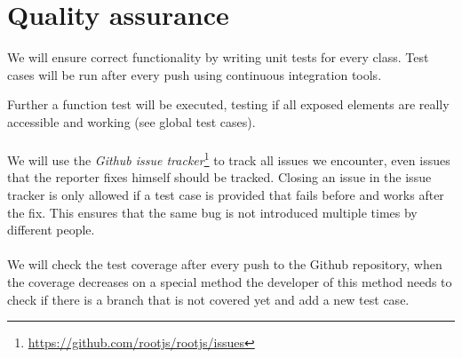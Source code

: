 \chapter{Quality assurance}
We will ensure correct functionality by writing unit tests for every class. Test cases will be run after every push using continuous integration tools.

Further a function test will be executed, testing if all exposed elements are really accessible and working (see global test cases).
\\\\
We will use the \textit{Github issue tracker}\footnote{\url{https://github.com/rootjs/rootjs/issues}} to track all issues we encounter, even issues that the reporter fixes himself should be tracked.
Closing an issue in the issue tracker is only allowed if a test case is provided that fails before and works after the fix. This ensures that the same bug is not introduced multiple times by different people.
\\\\
We will check the test coverage after every push to the Github repository, when the coverage decreases on a special method the developer of this method needs to check if there is a branch that is not covered yet and add a new test case.
